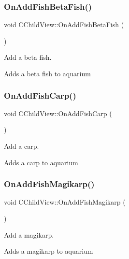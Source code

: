 \subsubsection{\texorpdfstring{On\+Add\+Fish\+Beta\+Fish()}{OnAddFishBetaFish()}}
{\footnotesize\ttfamily void C\+Child\+View\+::\+On\+Add\+Fish\+Beta\+Fish (\begin{DoxyParamCaption}{ }\end{DoxyParamCaption})}



Add a beta fish. 

Adds a beta fish to aquarium \mbox{\label{class_c_child_view_a767a63adaaaebeb086861a27fdf36c8c}} 
\subsubsection{\texorpdfstring{On\+Add\+Fish\+Carp()}{OnAddFishCarp()}}
{\footnotesize\ttfamily void C\+Child\+View\+::\+On\+Add\+Fish\+Carp (\begin{DoxyParamCaption}{ }\end{DoxyParamCaption})}



Add a carp. 

Adds a carp to aquarium \mbox{\label{class_c_child_view_ae57ff94ee7cff8741c8d5a88c7fbba65}} 
\subsubsection{\texorpdfstring{On\+Add\+Fish\+Magikarp()}{OnAddFishMagikarp()}}
{\footnotesize\ttfamily void C\+Child\+View\+::\+On\+Add\+Fish\+Magikarp (\begin{DoxyParamCaption}{ }\end{DoxyParamCaption})}



Add a magikarp. 

Adds a magikarp to aquarium \mbox{\label{class_c_child_view_a425e5b13c9f4bbb54628fc15e5f9cf24}} 
